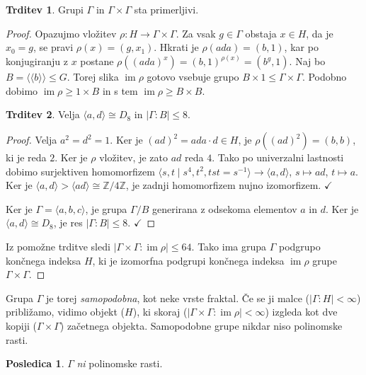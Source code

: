 \documentclass[11pt]{book}
\renewcommand{\llangle}{\langle\langle}
\renewcommand{\rrangle}{\rangle\rangle}
\def\ZZ{\mathbb{Z}}
\DeclareMathOperator\image{im}
\def\razstavi{\rho}
\def\kljuka{$\checkmark$}
\theoremstyle{definition}
\theoremstyle{zgled}
\theoremstyle{odprtproblem}
\theoremstyle{domacanaloga}
\newenvironment{dokaz}
    {\color{siva}\begin{proof}}
    {\end{proof}}
\theoremstyle{izrek}
\newtheorem*{trditev}{Trditev}
\newtheorem*{posledica}{Posledica}
\begin{document}
\begin{trditev}
Grupi $\Gamma$ in $\Gamma \times \Gamma$ sta primerljivi.
\end{trditev}

\begin{dokaz}
Opazujmo vložitev $\razstavi \colon H \to \Gamma \times \Gamma$. Za vsak $g \in \Gamma$ obstaja $x \in H$, da je $x_0 = g$, se pravi $\razstavi(x) = (g, x_1)$. Hkrati je $\razstavi(ada) = (b,1)$, kar po konjugiranju z $x$ postane $\razstavi((ada)^x) = (b,1)^{\razstavi(x)} = (b^g, 1)$. Naj bo $B = \llangle b \rrangle \leq G$. Torej slika $\image \razstavi$ gotovo vsebuje grupo $B \times 1 \leq \Gamma \times \Gamma$. Podobno dobimo $\image \razstavi \geq 1 \times B$ in s tem $\image \razstavi \geq B \times B$.

\begin{trditev}
Velja $\langle a,d \rangle \cong D_8$ in $|\Gamma : B| \leq 8$.
\end{trditev}

\begin{dokaz}
Velja $a^2 = d^2 = 1$. Ker je $(ad)^2 = ada \cdot d \in H$, je $\razstavi((ad)^2) = (b, b)$, ki je reda $2$. Ker je $\razstavi$ vložitev, je zato $ad$ reda $4$. Tako po univerzalni lastnosti dobimo surjektiven homomorfizem $\langle s,t \mid s^4, t^2, tst = s^{-1} \rangle \to \langle a,d \rangle$, $s \mapsto ad$, $t \mapsto a$. Ker je $\langle a,d \rangle > \langle ad \rangle \cong \ZZ/4\ZZ$, je zadnji homomorfizem nujno izomorfizem. \kljuka

Ker je $\Gamma = \langle a,b,c \rangle$, je grupa $\Gamma/B$ generirana z odsekoma elementov $a$ in $d$. Ker je $\langle a,d \rangle \cong D_8$, je res $|\Gamma : B| \leq 8$. \kljuka
\end{dokaz}


Iz pomožne trditve sledi $|\Gamma \times \Gamma : \image \razstavi| \leq 64$. Tako ima grupa $\Gamma$ podgrupo končnega indeksa $H$, ki je izomorfna podgrupi končnega indeksa $\image \razstavi$ grupe $\Gamma \times \Gamma$.
\end{dokaz}

Grupa $\Gamma$ je torej {\em samopodobna}, kot neke vrste fraktal. Če se ji malce ($|\Gamma : H| < \infty$) približamo, vidimo objekt ($H$), ki skoraj ($|\Gamma \times \Gamma : \image \razstavi| < \infty$) izgleda kot dve kopiji ($\Gamma \times \Gamma$) začetnega objekta. Samopodobne grupe nikdar niso polinomske rasti.

\begin{posledica}
$\Gamma$ {\em ni} polinomske rasti.
\end{posledica}
\end{document}
